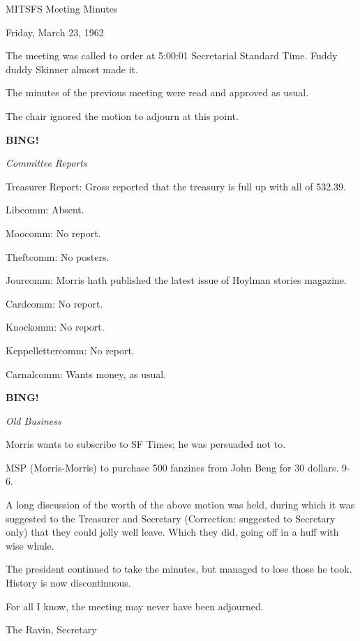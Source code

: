 \documentclass[12pt]{article}
\newcommand{\bing}{{\bf BING!} }
\newcommand{\goto}[1]{\bing \vskip 12pt \centerline{{\em{#1}}}}
\begin{document}
\begin{center}

MITSFS Meeting Minutes

Friday, March 23, 1962

\end{center}
 
\vspace{12pt}

\setlength{\parskip}{6pt}

\noindent
The meeting was called to order at 5:00:01 Secretarial Standard Time. Fuddy duddy Skinner almost made it.

The minutes of the previous meeting were read and approved as usual.

The chair ignored the motion to adjourn at this point.

\goto{Committee Reports}

Treasurer Report: Gross reported that the treasury is full up with all of 532.39.

Libcomm: Absent.

Moocomm: No report.

Theftcomm: No posters.

Jourcomm: Morris hath published the latest issue of Hoylman stories magazine.

Cardcomm: No report.

Knockomm: No report.

Keppellettercomm: No report.

Carnalcomm: Wants money, as usual.

\goto{Old Business}

Morris wants to subscribe to SF Times; he was persuaded not to.

MSP (Morris-Morris) to purchase 500 fanzines from John Beng for 30 dollars. 9-6.

A long discussion of the worth of the above motion was held, during which it was suggested to the Treasurer and Secretary (Correction: suggested to Secretary only) that they could jolly well leave. Which they did, going off in a huff with wise whule.

The president continued to take the minutes, but managed to lose those he took. History is now discontinuous.

For all I know, the meeting may never have been adjourned.

\vspace{12pt}

\centerline{The Ravin, Secretary}
\end{document}
